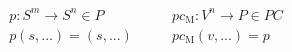 \documentclass[preview]{standalone}
\begin{document}
\begin{equation*}
  \begin{array}{l}
    p : S^m \rightarrow S^n \in P\\
    p (s,...)= (s,...)
  \end{array} 
  \qquad    
  \begin{array}{l}
    pc_{\text{M}} : V^n \rightarrow P \in PC\\
    pc_{\text{M}} (v,...)= p
  \end{array} 
\end{equation*}
\end{document}
